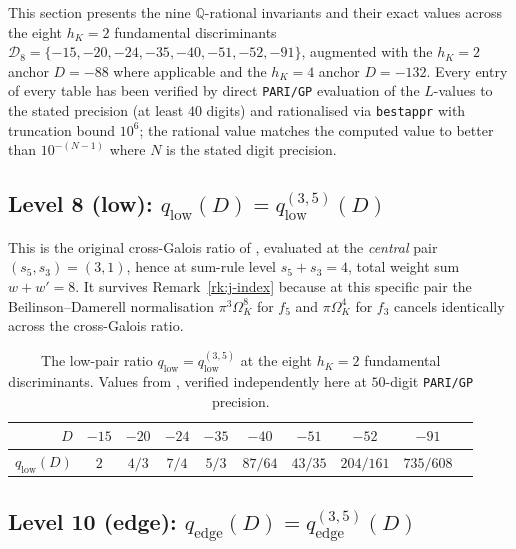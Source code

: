 \documentclass[11pt,a4paper]{amsart}
\theoremstyle{plain}
\theoremstyle{definition}
\newcommand{\Q}{\mathbb{Q}}
\newcommand{\qstr}[2]{q^{(#1,#2)}}
\begin{document}
This section presents the nine $\Q$-rational invariants and their exact
values across the eight $h_K=2$ fundamental discriminants
$\mathcal{D}_8 = \{-15,-20,-24,-35,-40,-51,-52,-91\}$, augmented with the
$h_K = 2$ anchor $D = -88$ where applicable and the $h_K = 4$ anchor
$D = -132$. Every entry of every table has been verified by direct
\texttt{PARI/GP} evaluation of the $L$-values to the stated precision
(at least $40$ digits) and rationalised via \texttt{bestappr} with
truncation bound $10^6$; the rational value matches the computed value to
better than $10^{-(N-1)}$ where $N$ is the stated digit precision.

\subsection{Level 8 (low): $q_{\mathrm{low}}(D) = \qstr{3}{5}_{\mathrm{low}}(D)$}

This is the original cross-Galois ratio of
\cite[Thm.~A]{Remondiere2026qD}, evaluated at the \emph{central} pair
$(s_5, s_3) = (3, 1)$, hence at sum-rule level $s_5 + s_3 = 4$, total weight
sum $w + w' = 8$. It survives Remark~\ref{rk:j-index} because at this
specific pair the Beilinson--Damerell normalisation
$\pi^3 \Omega_K^8$ for $f_5$ and $\pi\Omega_K^4$ for $f_3$ cancels
identically across the cross-Galois ratio.

\begin{table}[h]
\centering
\caption{The low-pair ratio $q_{\mathrm{low}} = \qstr{3}{5}_{\mathrm{low}}$ at
the eight $h_K = 2$ fundamental discriminants. Values from
\cite[Tab.~1]{Remondiere2026qD}, verified independently here at
$50$-digit \texttt{PARI/GP} precision.}\label{tab:level1}
\begin{tabular}{rccccccccc}
\toprule
$D$ & $-15$ & $-20$ & $-24$ & $-35$ & $-40$ & $-51$ & $-52$ & $-91$\\
\midrule
$q_{\mathrm{low}}(D)$ & $2$ & $4/3$ & $7/4$ & $5/3$ & $87/64$ & $43/35$ & $204/161$ & $735/608$\\
\bottomrule
\end{tabular}
\end{table}

\subsection{Level 10 (edge): $q_{\mathrm{edge}}(D) = \qstr{3}{5}_{\mathrm{edge}}(D)$}
\end{document}
